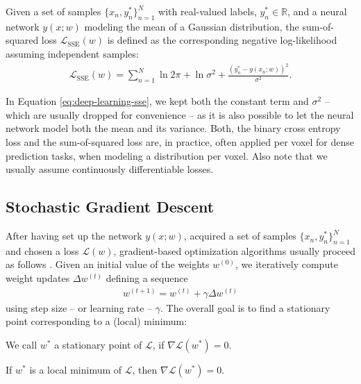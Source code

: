 \begin{definition}
  Given a set of samples $\{x_n,y^*_n\}_{n = 1}^N$ with real-valued labels,
  $y^*_n \in \mathbb{R}$, and a neural network $y(x;w)$ modeling the mean
  of a Gaussian distribution, the sum-of-squared loss $\mathcal{L}_{\text{SSE}}(w)$
  is defined as the corresponding negative log-likelihood assuming independent samples:
  \begin{align}
    \mathcal{L}_{\text{SSE}}(w) = \sum_{n = 1}^N \ln 2\pi + \ln \sigma^2 + \frac{(y_n^* - y(x_n;w))^2}{\sigma^2}.
    \label{eq:deep-learning-sse}
  \end{align}
\end{definition}

In Equation \eqref{eq:deep-learning-sse}, we kept both the constant term and
$\sigma^2$ -- which are usually dropped for convenience -- as it is also possible
to let the neural network model both the mean and its variance. Both, the binary
cross entropy loss and the sum-of-squared loss are, in practice, often applied
per voxel for dense prediction tasks, \ie when modeling a distribution per voxel.
Also note that
we usually assume continuously differentiable losses.

\subsection{Stochastic Gradient Descent}

After having set up the network $y(x;w)$, acquired a set of samples $\{x_n,y^*_n\}_{n = 1}^N$
and chosen a loss $\mathcal{L}(w)$, gradient-based optimization algorithms usually
proceed as follows \cite[Section~2.2]{NocedalWright:2006}.
Given an initial value of the weights $w^{(0)}$, we iteratively compute weight
updates $\Delta w^{(t)}$ defining a sequence
\begin{align}
  w^{(t + 1)} = w^{(t)} + \gamma \Delta w^{(t)}
\end{align}
using step size -- or learning rate -- $\gamma$.
The overall goal is to find a stationary point corresponding to
a (local) minimum:

\begin{definition}
  We call $w^*$ a stationary point of $\mathcal{L}$, if $\nabla \mathcal{L}(w^*) = 0$.
\end{definition}

\begin{lemma}
  \label{lemma:deep-learning-necessary-condition}
  If $w^*$ is a local minimum of $\mathcal{L}$,
  then $\nabla \mathcal{L}(w^*) = 0$.
\end{lemma}

